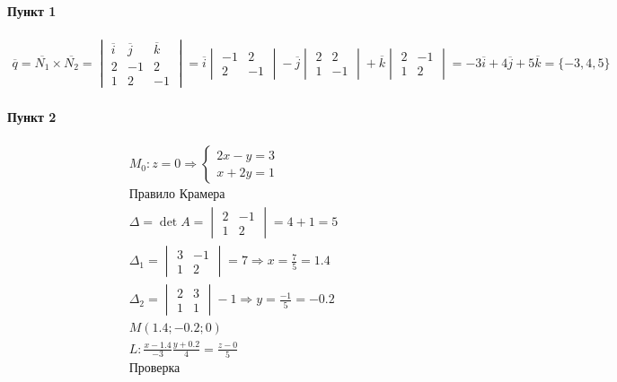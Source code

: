 \documentclass{article}
\begin{document}
\paragraph{Пункт 1}
\begin{gather*}
    \overline{q} = 
    \overline{N_1} \times \overline{N_2} =
    \begin{vmatrix}
        \overline{i} & \overline{j} & \overline{k} \\
                  2  &          -1  &           2  \\
                  1  &           2  &          -1  
    \end{vmatrix} =
    \overline{i} \begin{vmatrix}
        -1 &  2 \\
        2  & -1
    \end{vmatrix} -
    \overline{j} \begin{vmatrix}
        2 &  2 \\
        1 & -1
    \end{vmatrix} +
    \overline{k} \begin{vmatrix}
        2 & -1 \\
        1 &  2
    \end{vmatrix} =
    -3 \overline{i} + 4 \overline{j} + 5 \overline{k} = \{ -3, 4, 5 \}
\end{gather*}

\paragraph{Пункт 2}
\begin{gather*}
    M_0: z = 0 \Rightarrow
    \begin{cases}
        2x -  y = 3 \\
         x + 2y = 1
    \end{cases} \\
    \text{Правило Крамера} \\
    \Delta = \det A = \begin{vmatrix}
        2 & -1 \\
        1 &  2  
    \end{vmatrix} = 4 + 1 = 5 \\
    \Delta_1 = \begin{vmatrix}
        3 & -1 \\
        1 &  2
    \end{vmatrix} = 7 \Rightarrow x = \frac{7}{5} =  1.4 \\
    \Delta_2 = \begin{vmatrix}
        2 & 3 \\
        1 & 1
    \end{vmatrix} -1 \Rightarrow y = \frac{-1}{5} = -0.2 \\
    M(1.4; -0.2; 0) \\
    L: \frac{x - 1.4}{-3} \frac{y + 0.2}{4} = \frac{z - 0}{5} \\
    \text{Проверка} \\
\end{gather*}
\end{document}
